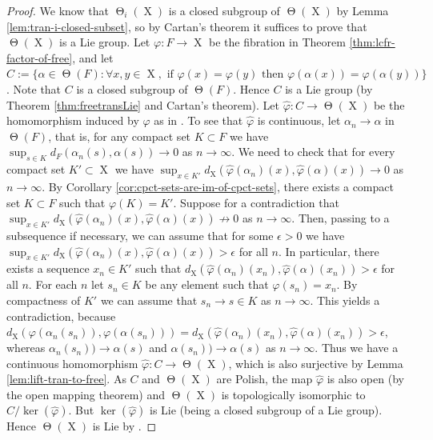 \documentclass[a4paper,12pt,reqno]{amsart}
\theoremstyle{definition}
\def\to{\rightarrow}
\newcommand{\wh}{\widehat}
\DeclareMathOperator{\tran}{\Theta}
\DeclareMathOperator{\ns}{X}
\begin{document}
\begin{proof}
We know that $\tran_i(\ns)$ is a closed subgroup of $\tran(\ns)$ by Lemma \ref{lem:tran-i-closed-subset}, so by Cartan's theorem it suffices to prove that $\tran(\ns)$ is a Lie group. Let $\varphi:F\to \ns$ be the fibration in Theorem \ref{thm:lcfr-factor-of-free}, and let
$C:=\{\alpha\in \tran(F):\forall x,y\in \ns, \text{ if } \varphi(x)=\varphi(y) \text{ then } \varphi(\alpha(x))=\varphi(\alpha(y))\}$. Note that $C$ is a closed subgroup of $\tran(F)$. Hence $C$ is a Lie group (by Theorem \ref{thm:freetransLie} and Cartan's theorem). Let $\wh{\varphi}:C\to \tran(\ns)$ be the homomorphism induced by $\varphi$ as in \cite[Lemma 1.5]{CGSS}. 
 To see that $\wh{\varphi}$ is continuous, let $\alpha_n\to\alpha$ in $\tran(F)$, that is, for any compact set $K\subset F$ we have $\sup_{s\in K}d_{F}(\alpha_n(s),\alpha(s))\to 0$ as $n\to\infty$. We need to check that for every compact set $K'\subset \ns$ we have $\sup_{x\in K'}d_{\ns}(\widehat{\varphi}(\alpha_n)(x),\widehat{\varphi}(\alpha)(x))\to 0$ as $n\to\infty$. By Corollary \ref{cor:cpct-sets-are-im-of-cpct-sets}, there exists a compact set $K\subset F$ such that $\varphi(K)=K'$. Suppose for a contradiction that $\sup_{x\in K'}d_{\ns}(\widehat{\varphi}(\alpha_n)(x),\widehat{\varphi}(\alpha)(x))\not\to 0$ as $n\to\infty$. Then, passing to a subsequence if necessary, we can assume that for some $\epsilon>0$ we have  $\sup_{x\in K'}d_{\ns}(\widehat{\varphi}(\alpha_n)(x),\widehat{\varphi}(\alpha)(x))>\epsilon$ for all $n$. In particular, there exists a sequence $x_n\in K'$ such that $d_{\ns}(\widehat{\varphi}(\alpha_n)(x_n),\widehat{\varphi}(\alpha)(x_n))>\epsilon$ for all $n$. For each $n$ let $s_n\in K$ be any element such that $\varphi(s_n)=x_n$. By compactness of $K'$ we can assume that $s_n\to s\in K$ as $n\to \infty$. This yields a contradiction, because $d_{\ns}(\varphi(\alpha_n(s_n)),\varphi(\alpha(s_n)))=d_{\ns}(\widehat{\varphi}(\alpha_n)(x_n),\widehat{\varphi}(\alpha)(x_n))>\epsilon$, whereas $\alpha_n(s_n))\to \alpha(s)$ and $\alpha(s_n))\to\alpha(s)$ as $n\to \infty$. Thus we have a continuous homomorphism $\wh{\varphi}:C\to \tran(\ns)$, which is also surjective by Lemma \ref{lem:lift-tran-to-free}. As $C$ and $\tran(\ns)$ are Polish, the map $\wh{\varphi}$ is also open (by the open mapping theorem) and $\tran(\ns)$ is topologically isomorphic to $C/\ker(\widehat{\varphi})$. But $\ker(\widehat{\varphi})$ is Lie (being a closed subgroup of a Lie group). Hence $\tran(\ns)$ is Lie by \cite[Theorem  2.6]{Mosk}.
\end{proof}
\end{document}
